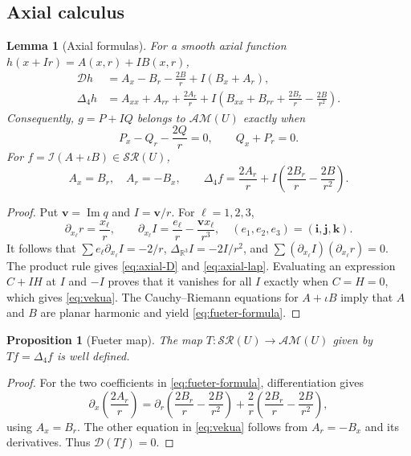 \documentclass[11pt,a4paper]{article}
\numberwithin{equation}{section}
\newtheorem{proposition}[theorem]{Proposition}
\newtheorem{lemma}[theorem]{Lemma}
\theoremstyle{definition}
\theoremstyle{remark}
\newcommand{\R}{\mathbb R}
\newcommand{\ii}{\mathbf i}
\newcommand{\jj}{\mathbf j}
\newcommand{\kk}{\mathbf k}
\newcommand{\ic}{\iota}
\newcommand{\D}{\mathcal D}
\newcommand{\lap}{\Delta_4}
\newcommand{\SR}{\mathcal{SR}}
\newcommand{\AM}{\mathcal{AM}}
\newcommand{\Ima}{\operatorname{Im}}
\newcommand{\cI}{\mathcal I}
\begin{document}
\subsection{Axial calculus}
\begin{lemma}[Axial formulas]\label{lem:axial}
For a smooth axial function $h(x+Ir)=A(x,r)+I B(x,r)$,
\begin{align}
 \D h&=A_x-B_r-\frac{2B}{r}+I(B_x+A_r),\label{eq:axial-D}\\
 \lap h&=A_{xx}+A_{rr}+\frac{2A_r}{r}
 +I\left(B_{xx}+B_{rr}+\frac{2B_r}{r}-\frac{2B}{r^2}\right).
 \label{eq:axial-lap}
\end{align}
Consequently, $g=P+I Q$ belongs to $\AM(U)$ exactly when
\begin{equation}
 P_x-Q_r-\frac{2Q}{r}=0,\qquad Q_x+P_r=0.
 \label{eq:vekua}
\end{equation}
For $f=\cI(A+\ic B)\in\SR(U)$,
\begin{equation}
 A_x=B_r,\quad A_r=-B_x,\qquad
 \lap f=\frac{2A_r}{r}
  +I\left(\frac{2B_r}{r}-\frac{2B}{r^2}\right).
 \label{eq:fueter-formula}
\end{equation}
\end{lemma}
\begin{proof}
Put $\boldsymbol v=\Ima q$ and $I=\boldsymbol v/r$. For $\ell=1,2,3$,
\[
 \partial_{x_\ell}r=\frac{x_\ell}{r},\qquad
 \partial_{x_\ell}I=\frac{e_\ell}{r}-\frac{\boldsymbol v x_\ell}{r^3},
 \quad(e_1,e_2,e_3)=(\ii,\jj,\kk).
\]
It follows that $\sum e_\ell\partial_{x_\ell}I=-2/r$,
$\Delta_{\R^3}I=-2I/r^2$, and
$\sum(\partial_{x_\ell}I)(\partial_{x_\ell}r)=0$.
The product rule gives \eqref{eq:axial-D} and \eqref{eq:axial-lap}.
Evaluating an expression $C+I H$ at $I$ and $-I$ proves that it vanishes for
all $I$ exactly when $C=H=0$, which gives \eqref{eq:vekua}. The
Cauchy--Riemann equations for $A+\ic B$ imply that $A$ and $B$ are planar
harmonic and yield \eqref{eq:fueter-formula}.
\end{proof}

\begin{proposition}[Fueter map]\label{prop:fueter}
The map $T:\SR(U)\to\AM(U)$ given by $Tf=\lap f$ is well defined.
\end{proposition}
\begin{proof}
For the two coefficients in \eqref{eq:fueter-formula}, differentiation gives
\[
 \partial_x\left(\frac{2A_r}{r}\right)
 =\partial_r\left(\frac{2B_r}{r}-\frac{2B}{r^2}\right)
   +\frac2r\left(\frac{2B_r}{r}-\frac{2B}{r^2}\right),
\]
using $A_x=B_r$. The other equation in \eqref{eq:vekua} follows from
$A_r=-B_x$ and its derivatives. Thus $\D(Tf)=0$.
\end{proof}
\end{document}
